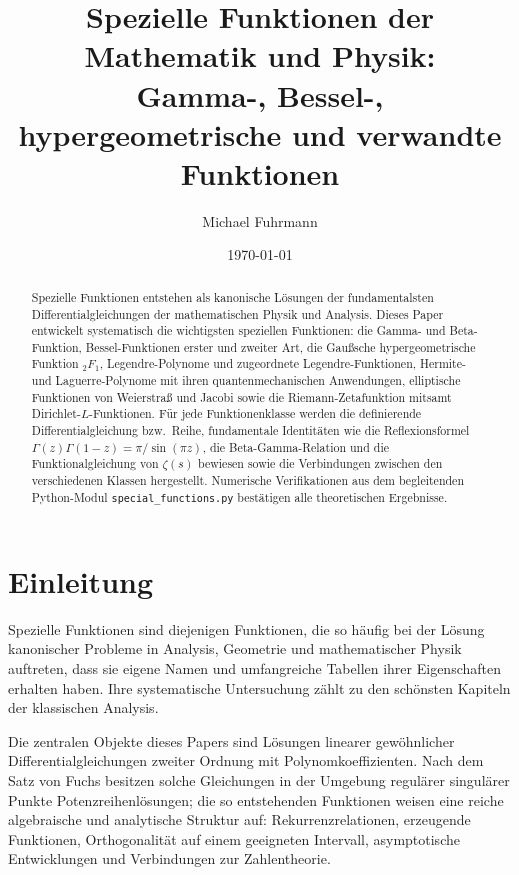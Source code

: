 \documentclass[12pt,a4paper]{amsart}
\author{Michael Fuhrmann}
\date{\today}
\theoremstyle{definition}
\begin{document}
\title{Spezielle Funktionen der Mathematik und Physik:\\
Gamma-, Bessel-, hypergeometrische und verwandte Funktionen}

\begin{abstract}
Spezielle Funktionen entstehen als kanonische Lösungen der fundamentalsten Differentialgleichungen
der mathematischen Physik und Analysis.  Dieses Paper entwickelt systematisch die wichtigsten
speziellen Funktionen: die Gamma- und Beta-Funktion, Bessel-Funktionen erster und zweiter Art,
die Gaußsche hypergeometrische Funktion \({}_2F_1\), Legendre-Polynome und zugeordnete
Legendre-Funktionen, Hermite- und Laguerre-Polynome mit ihren quantenmechanischen Anwendungen,
elliptische Funktionen von Weierstra\ss{} und Jacobi sowie die Riemann-Zetafunktion mitsamt
Dirichlet-\(L\)-Funktionen.  Für jede Funktionenklasse werden die definierende
Differentialgleichung bzw.\ Reihe, fundamentale Identitäten wie die Reflexionsformel
\(\Gamma(z)\Gamma(1-z)=\pi/\sin(\pi z)\), die Beta-Gamma-Relation und die
Funktionalgleichung von \(\zeta(s)\) bewiesen sowie die Verbindungen zwischen den
verschiedenen Klassen hergestellt.  Numerische Verifikationen aus dem begleitenden
Python-Modul \texttt{special\_functions.py} bestätigen alle theoretischen Ergebnisse.
\end{abstract}

\maketitle

\tableofcontents

\section{Einleitung}

Spezielle Funktionen sind diejenigen Funktionen, die so häufig bei der Lösung kanonischer
Probleme in Analysis, Geometrie und mathematischer Physik auftreten, dass sie eigene Namen
und umfangreiche Tabellen ihrer Eigenschaften erhalten haben.  Ihre systematische Untersuchung
zählt zu den schönsten Kapiteln der klassischen Analysis.

Die zentralen Objekte dieses Papers sind Lösungen linearer gewöhnlicher Differentialgleichungen
zweiter Ordnung mit Polynomkoeffizienten.  Nach dem Satz von Fuchs besitzen solche
Gleichungen in der Umgebung regulärer singulärer Punkte Potenzreihenlösungen; die so
entstehenden Funktionen weisen eine reiche algebraische und analytische Struktur auf:
Rekurrenzrelationen, erzeugende Funktionen, Orthogonalität auf einem geeigneten Intervall,
asymptotische Entwicklungen und Verbindungen zur Zahlentheorie.
\end{document}
